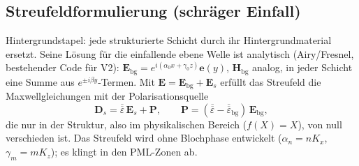 \subsection{Streufeldformulierung (schräger Einfall)}\label{sec:scatfield}
Hintergrundstapel: jede strukturierte Schicht durch ihr Hintergrundmaterial ersetzt. Seine Lösung für die einfallende
ebene Welle ist analytisch (Airy/Fresnel, bestehender Code für V2):
$\mathbf E_{\text{bg}}=e^{i(\alpha_0x+\gamma_0z)}\mathbf e(y)$, $\mathbf H_{\text{bg}}$ analog, in jeder Schicht eine Summe aus
$e^{\pm i\beta y}$-Termen. Mit $\mathbf E=\mathbf E_{\text{bg}}+\mathbf E_s$ erfüllt das Streufeld die Maxwellgleichungen
mit der Polarisationsquelle
\begin{equation}
  \mathbf D_s=\overline{\overline\varepsilon}\,\mathbf E_s+\mathbf P,\qquad
  \mathbf P=(\overline{\overline\varepsilon}-\overline{\overline\varepsilon}_{\text{bg}})\,\mathbf E_{\text{bg}},
  \label{eq:scat_source}
\end{equation}
die nur in der Struktur, also im physikalischen Bereich ($f(X)=X$), von null verschieden ist. Das Streufeld wird ohne
Blochphase entwickelt ($\alpha_n=nK_x$, $\gamma_m=mK_z$); es klingt in den PML-Zonen ab.
